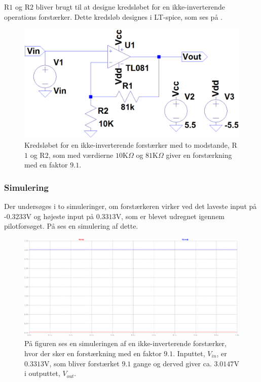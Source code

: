 \noindent R$1$ og R$2$ bliver brugt til at designe kredsløbet for en ikke-inverterende operations forstærker. Dette kredsløb designes i LT-spice, som ses på . 
\begin{figure}[H]
\centering
\includegraphics[scale=0.3]{figures/cProblemloesning/Forstaerker_faktor18.PNG}
\caption{Kredsløbet for en ikke-inverterende forstærker med to modstande, R$1$ og R$2$, som med værdierne $10$K$\Omega$ og $81$K$\Omega$ giver en forstærkning med en faktor $9.1$.}
\label{fig:Forstaerker_faktor18}
\end{figure} 

\subsubsection{Simulering}\label{Subsec:Forstaerker_simu}
Der undersøges i to simuleringer, om forstærkeren virker ved det laveste input på -$0.3233$V og højeste input på $0.3313$V, som er blevet udregnet igennem pilotforsøget. På  ses en simulering af dette.

\begin{figure}[H]
\centering
\includegraphics[scale=0.3]{figures/cProblemloesning/Forstaerker_faktor18_simulering.PNG}
\caption{På figuren ses en simuleringen af en ikke-inverterende forstærker, hvor der sker en forstærkning med en faktor $9.1$. Inputtet, $V_{in}$, er $0.3313$V, som bliver forstærket $9.1$ gange og derved giver ca. $3.0147$V i outputtet, $V_{out}$.}
\label{fig:Forstaerker_faktor18_simulering}
\end{figure}

